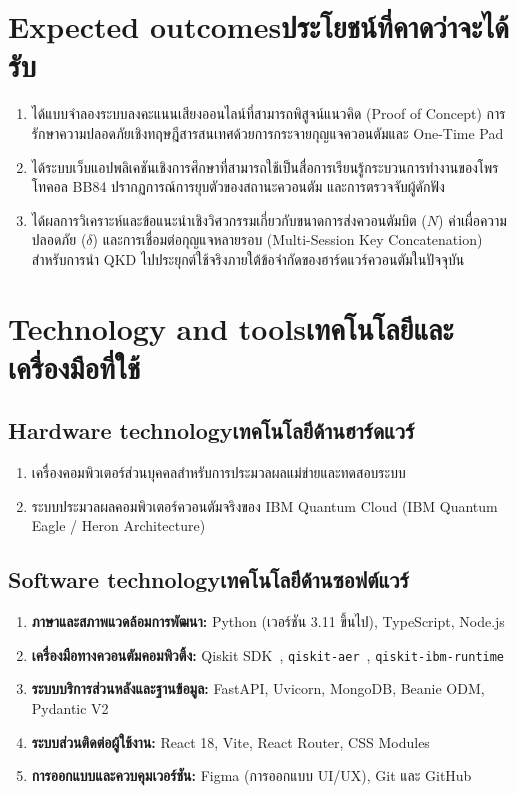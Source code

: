 \section{\ifenglish Expected outcomes\else ประโยชน์ที่คาดว่าจะได้รับ\fi}
\begin{enumerate}
    \item ได้แบบจำลองระบบลงคะแนนเสียงออนไลน์ที่สามารถพิสูจน์แนวคิด (Proof of Concept) การรักษาความปลอดภัยเชิงทฤษฎีสารสนเทศด้วยการกระจายกุญแจควอนตัมและ One-Time Pad
    \item ได้ระบบเว็บแอปพลิเคชันเชิงการศึกษาที่สามารถใช้เป็นสื่อการเรียนรู้กระบวนการทำงานของโพรโทคอล BB84 ปรากฏการณ์การยุบตัวของสถานะควอนตัม และการตรวจจับผู้ดักฟัง
    \item ได้ผลการวิเคราะห์และข้อแนะนำเชิงวิศวกรรมเกี่ยวกับขนาดการส่งควอนตัมบิต ($N$) ค่าเผื่อความปลอดภัย ($\delta$) และการเชื่อมต่อกุญแจหลายรอบ (Multi-Session Key Concatenation) สำหรับการนำ QKD ไปประยุกต์ใช้จริงภายใต้ข้อจำกัดของฮาร์ดแวร์ควอนตัมในปัจจุบัน
\end{enumerate}

\section{\ifenglish Technology and tools\else เทคโนโลยีและเครื่องมือที่ใช้\fi}

\subsection{\ifenglish Hardware technology\else เทคโนโลยีด้านฮาร์ดแวร์\fi}
\begin{enumerate}
    \item เครื่องคอมพิวเตอร์ส่วนบุคคลสำหรับการประมวลผลแม่ข่ายและทดสอบระบบ
    \item ระบบประมวลผลคอมพิวเตอร์ควอนตัมจริงของ IBM Quantum Cloud (IBM Quantum Eagle / Heron Architecture)~\cite{ibm_quantum_platform}
\end{enumerate}

\subsection{\ifenglish Software technology\else เทคโนโลยีด้านซอฟต์แวร์\fi}
\begin{enumerate}
    \item \textbf{ภาษาและสภาพแวดล้อมการพัฒนา:} Python (เวอร์ชัน 3.11 ขึ้นไป), TypeScript, Node.js
    \item \textbf{เครื่องมือทางควอนตัมคอมพิวติ้ง:} Qiskit SDK~\cite{qiskit2024}, \texttt{qiskit-aer}~\cite{qiskit_aer}, \texttt{qiskit-ibm-runtime}~\cite{qiskit_ibm_runtime}
    \item \textbf{ระบบบริการส่วนหลังและฐานข้อมูล:} FastAPI, Uvicorn, MongoDB, Beanie ODM, Pydantic V2
    \item \textbf{ระบบส่วนติดต่อผู้ใช้งาน:} React 18, Vite, React Router, CSS Modules
    \item \textbf{การออกแบบและควบคุมเวอร์ชัน:} Figma (การออกแบบ UI/UX), Git และ GitHub
\end{enumerate}

